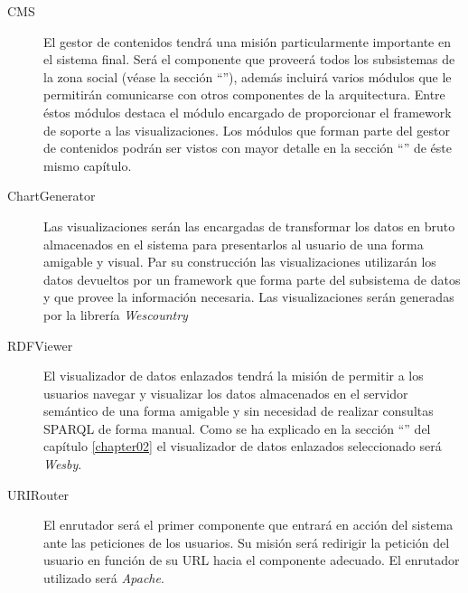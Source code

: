 \begin{description}
	\item[CMS]  El gestor de contenidos tendrá una misión particularmente importante en el sistema final.  Será el componente que proveerá todos los subsistemas de la zona social (véase la sección ``''), además incluirá varios módulos que le permitirán comunicarse con otros componentes de la arquitectura.  Entre éstos módulos destaca el módulo encargado de proporcionar el framework de soporte a las visualizaciones.  Los módulos que forman parte del gestor de contenidos podrán ser vistos con mayor detalle en la sección ``'' de éste mismo capítulo.
	\item[ChartGenerator]  Las visualizaciones serán las encargadas de transformar los datos en bruto almacenados en el sistema para presentarlos al usuario de una forma amigable y visual.  Par su construcción las visualizaciones utilizarán los datos devueltos por un framework que forma parte del subsistema de datos y que provee la información necesaria.  Las visualizaciones serán generadas por la librería \textit{Wescountry}
	\item[RDFViewer]  El visualizador de datos enlazados tendrá la misión de permitir a los usuarios navegar y visualizar los datos almacenados en el servidor semántico de una forma amigable y sin necesidad de realizar consultas SPARQL de forma manual.  Como se ha explicado en la sección ``'' del capítulo \ref{chapter02} el visualizador de datos enlazados seleccionado será \textit{Wesby}.
	\item[URIRouter]  El enrutador será el primer componente que entrará en acción del sistema ante las peticiones de los usuarios.  Su misión será redirigir la petición del usuario en función de su URL hacia el componente adecuado.  El enrutador utilizado será \textit{Apache}.
\end{description}
